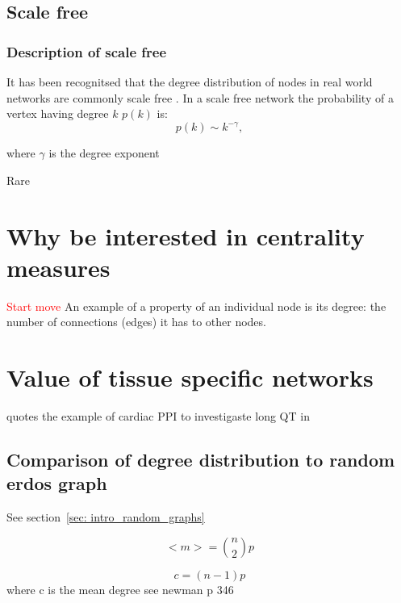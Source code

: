 \subsection{Scale free}
\label{sec:scale_free}
\subsubsection{Description of scale free}
It has been recognitsed that the degree distribution of nodes in real world networks are commonly scale free \cite{barabasi1999emergence} \cite{barabasi1999mean}. In a scale free network the probability of a vertex having degree $k$ $p(k)$ is:
\begin{equation}
    p(k) \sim k^{-\gamma},
\end{equation}
\label{eq:scale free}

where $\gamma$ is the degree exponent \cite{barabasi2016network}

Rare \cite{broido2019scale}



\section{Why be interested in centrality measures}
\textcolor{red}{Start move}
An example of a property of an individual node is its degree: the number of connections (edges) it has to other nodes.

\section{Value of tissue specific networks}
\cite{parikshak2015systems} quotes the example of cardiac PPI to investigaste long QT in \cite{lundby2014annotation}



\subsection{Comparison of degree distribution to random erdos graph}
See section~\ref{sec: intro_random_graphs}

\begin{equation}
    <m> = \binom{n}{2}p
\end{equation}


\begin{equation}
    c = (n-1)p
\end{equation}
where c is the mean degree see newman p 346

